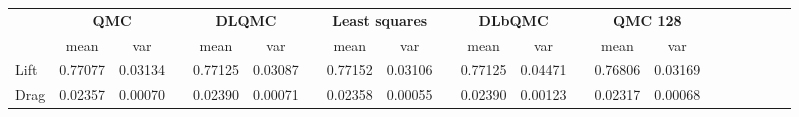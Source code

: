 \begin{tabular}{lcccccccccccccccccccc}
\toprule
 &\multicolumn{2}{c}{\textbf{QMC}}&&\multicolumn{2}{c}{\textbf{DLQMC}}&&\multicolumn{2}{c}{\textbf{Least squares}}&&\multicolumn{2}{c}{\textbf{DLbQMC}}&&\multicolumn{2}{c}{\textbf{QMC 128}}\\ 
\cmidrule(r){2-3} \cmidrule(r){5-6} \cmidrule(r){8-9} \cmidrule(r){11-12}
 &mean&var&&mean&var&&mean&var&&mean&var&&mean&var\\ 
\midrule
Lift &0.77077&0.03134&&0.77125&0.03087&&0.77152&0.03106&&0.77125&0.04471&&0.76806&0.03169\\ 
Drag &0.02357&0.00070&&0.02390&0.00071&&0.02358&0.00055&&0.02390&0.00123&&0.02317&0.00068\\ 
\bottomrule
\end{tabular}

